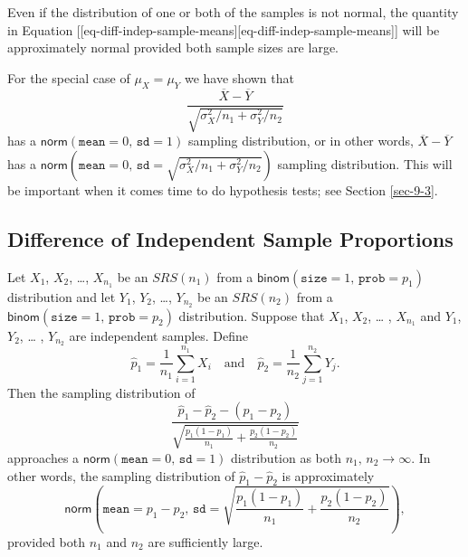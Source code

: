 \documentclass[captions=tableheading]{scrbook}
\begin{document}
\begin{rem}
Even if the distribution of one or both of the samples is not normal, the quantity in Equation [[eq-diff-indep-sample-means][eq-diff-indep-sample-means]] will be approximately normal provided both sample sizes are large.
\end{rem}

\begin{rem}
For the special case of \(\mu_{X}=\mu_{Y}\) we have shown that 
\begin{equation} \frac{\overline{X}-\overline{Y}}{\sqrt{\sigma_{X}^{2}/n_{1}+\sigma_{Y}^{2}/n_{2}}}
\end{equation}
has a \(\mathsf{norm}(\mathtt{mean}=0,\,\mathtt{sd}=1)\) sampling distribution, or in other words, \(\overline{X}-\overline{Y}\) has a \(\mathsf{norm}(\mathtt{mean}=0,\,\mathtt{sd}=\sqrt{\sigma_{X}^{2}/n_{1}+\sigma_{Y}^{2}/n_{2}})\) sampling distribution. This will be important when it comes time to do hypothesis tests; see Section \ref{sec-9-3}.
\end{rem}
\subsection{Difference of Independent Sample Proportions}
\label{sec-8-4-2}


\begin{prop}
Let \(X_{1}\), \(X_{2}\), \ldots{}, \(X_{n_{1}}\) be an \(SRS(n_{1})\) from a \(\mathsf{binom}(\mathtt{size}=1,\,\mathtt{prob}=p_{1})\) distribution and let \(Y_{1}\), \(Y_{2}\), \ldots{}, \(Y_{n_{2}}\) be an \(SRS(n_{2})\) from a \(\mathsf{binom}(\mathtt{size}=1,\,\mathtt{prob}=p_{2})\) distribution. Suppose that \(X_{1}\), \(X_{2}\), \ldots{} , \(X_{n_{1}}\) and \(Y_{1}\), \(Y_{2}\), \ldots{} , \(Y_{n_{2}}\) are independent samples. Define 
\begin{equation}
\hat{p}_{1}=\frac{1}{n_{1}}\sum_{i=1}^{n_{1}}X_{i}\quad\mbox{and}\quad\hat{p}_{2}=\frac{1}{n_{2}}\sum_{j=1}^{n_{2}}Y_{j}.
\end{equation}
Then the sampling distribution of
\begin{equation}
\frac{\hat{p}_{1}-\hat{p}_{2}-(p_{1}-p_{2})}{\sqrt{\frac{p_{1}(1-p_{1})}{n_{1}}+\frac{p_{2}(1-p_{2})}{n_{2}}}}
\end{equation}
approaches a \(\mathsf{norm}(\mathtt{mean}=0,\,\mathtt{sd}=1)\) distribution as both \(n_{1},\, n_{2}\to\infty\). In other words, the sampling distribution of \(\hat{p}_{1}-\hat{p}_{2}\) is approximately
\begin{equation}
\mathsf{norm}\left(\mathtt{mean}=p_{1}-p_{2},\,\mathtt{sd}=\sqrt{\frac{p_{1}(1-p_{1})}{n_{1}}+\frac{p_{2}(1-p_{2})}{n_{2}}}\right),
\end{equation}
provided both \(n_{1}\) and \(n_{2}\) are sufficiently large.
\end{prop}
\end{document}
